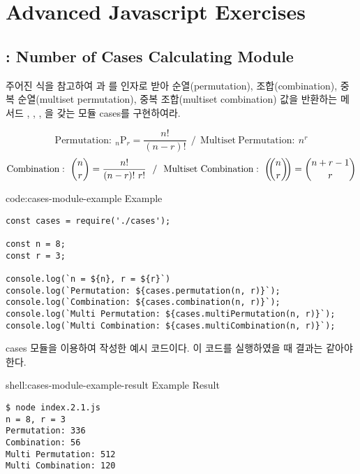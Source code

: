 \section{Advanced Javascript Exercises}\label{sect:advanced-javascript-exercises}

\subsection*{: Number of Cases Calculating Module}

주어진 식을 참고하여 과 를 인자로 받아 순열(permutation), 조합(combination), 중복 순열(multiset permutation), 중복 조합(multiset combination) 값을 반환하는 메서드 , , , 을 갖는 모듈 cases를 구현하여라.

$$ \mathrm{Permutation}:~{}_n\mathrm{P}_r = \frac{n!}{(n-r)!}~~/~~\mathrm{Multiset~Permutation}:~n^r $$
$$ \mathrm{Combination}:~\binom{n}{r} = \frac{n!}{(n-r)!~r!}~~/~~\mathrm{Multiset~Combination}:~\left(\kern-.3em\binom{n}{r}\kern-.3em\right) = \binom{n+r-1}{r} $$

\begin{codeenv}{code:cases-module-example}{ Example}\begin{verbatim}
const cases = require('./cases');

const n = 8;
const r = 3;

console.log(`n = ${n}, r = ${r}`)
console.log(`Permutation: ${cases.permutation(n, r)}`);
console.log(`Combination: ${cases.combination(n, r)}`);
console.log(`Multi Permutation: ${cases.multiPermutation(n, r)}`);
console.log(`Multi Combination: ${cases.multiCombination(n, r)}`);
\end{verbatim}
\end{codeenv}

\은 cases 모듈을 이용하여 작성한 예시 코드이다. 이 코드를 실행하였을 때 결과는 \와 같아야 한다.

\begin{shellenv}{shell:cases-module-example-result}{ Example Result}\begin{verbatim}
$ node index.2.1.js
n = 8, r = 3
Permutation: 336
Combination: 56
Multi Permutation: 512
Multi Combination: 120
\end{verbatim}
\end{shellenv}
\newpage

